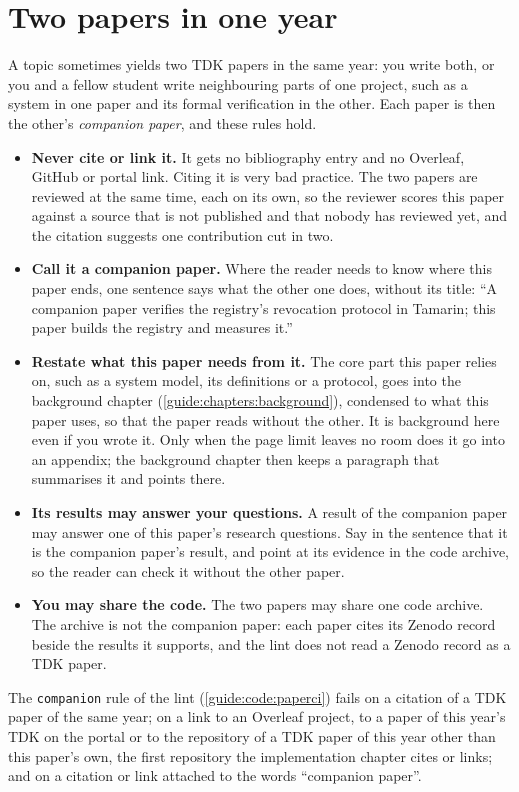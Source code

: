 \section{Two papers in one year}\label{guide:tdk:companion}
A topic sometimes yields two TDK papers in the same year: you write both, or you and a fellow student write neighbouring parts of one project, such as a system in one paper and its formal verification in the other. Each paper is then the other's \emph{companion paper}, and these rules hold.
\begin{itemize}
  \item \textbf{Never cite or link it.} It gets no bibliography entry and no Overleaf, GitHub or portal link. Citing it is very bad practice. The two papers are reviewed at the same time, each on its own, so the reviewer scores this paper against a source that is not published and that nobody has reviewed yet, and the citation suggests one contribution cut in two.
  \item \textbf{Call it a companion paper.} Where the reader needs to know where this paper ends, one sentence says what the other one does, without its title: \enquote{A companion paper verifies the registry's revocation protocol in Tamarin; this paper builds the registry and measures it.}
  \item \textbf{Restate what this paper needs from it.} The core part this paper relies on, such as a system model, its definitions or a protocol, goes into the background chapter (\cref{guide:chapters:background}), condensed to what this paper uses, so that the paper reads without the other. It is background here even if you wrote it. Only when the page limit leaves no room does it go into an appendix; the background chapter then keeps a paragraph that summarises it and points there.
  \item \textbf{Its results may answer your questions.} A result of the companion paper may answer one of this paper's research questions. Say in the sentence that it is the companion paper's result, and point at its evidence in the code archive, so the reader can check it without the other paper.
  \item \textbf{You may share the code.} The two papers may share one code archive. The archive is not the companion paper: each paper cites its Zenodo record beside the results it supports, and the lint does not read a Zenodo record as a TDK paper.
\end{itemize}
The \texttt{companion} rule of the lint (\cref{guide:code:paperci}) fails on a citation of a TDK paper of the same year; on a link to an Overleaf project, to a paper of this year's TDK on the portal or to the repository of a TDK paper of this year other than this paper's own, the first repository the implementation chapter cites or links; and on a citation or link attached to the words \enquote{companion paper}.

